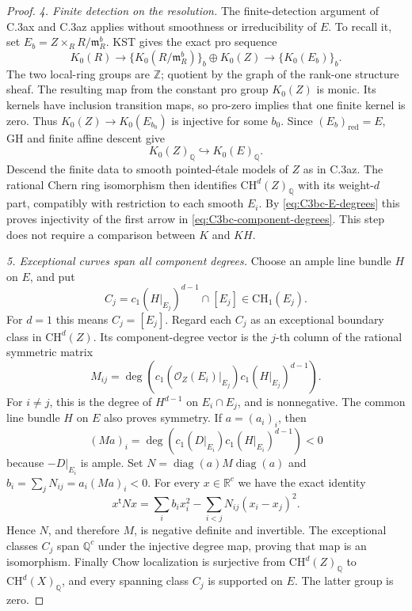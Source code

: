 \begin{proof}
\emph{4. Finite detection on the resolution.}
The finite-detection argument of C.3ax and C.3az applies without
smoothness or irreducibility of \(E\). To recall it, set
\(E_b=Z\times_RR/\mathfrak m_R^b\). KST
\citep[Theorem A and (1.6), author pp.~2--3]
{rootKerzStrunkTamme2018} gives the exact pro sequence
\[
 K_0(R)\longrightarrow
 \{K_0(R/\mathfrak m_R^b)\}_b\oplus K_0(Z)
             \longrightarrow\{K_0(E_b)\}_b.
\]
The two local-ring groups are \(\mathbb Z\); quotient by the
graph of the rank-one structure sheaf. The resulting map from
the constant pro group \(K_0(Z)\) is monic. Its kernels have
inclusion transition maps, so pro-zero implies that one finite
kernel is zero. Thus \(K_0(Z)\to K_0(E_{b_0})\) is injective
for some \(b_0\). Since \((E_b)_{\mathrm{red}}=E\), GH
\citep[Theorem A, p.~29]{rootGeisserHesselholt2011} and finite
affine descent give
\[
                         K_0(Z)_{\mathbb Q}
                              \hookrightarrow K_0(E)_{\mathbb Q}.
\]
Descend the finite data to smooth pointed-\'etale models of \(Z\)
as in C.3az. The rational Chern ring isomorphism
\citep[Example 15.2.16(b), pp.~294--295]{frC4Fulton1998}
then identifies \(\mathrm{CH}^d(Z)_{\mathbb Q}\) with its
weight-\(d\) part, compatibly with restriction to each smooth
\(E_i\). By \eqref{eq:C3bc-E-degrees} this proves injectivity
of the first arrow in \eqref{eq:C3bc-component-degrees}.
This step does not require a comparison between \(K\) and \(KH\).

\emph{5. Exceptional curves span all component degrees.}
Choose an ample line bundle \(H\) on \(E\), and put
\[
 C_j=c_1(H|_{E_j})^{d-1}\cap[E_j]\in\mathrm{CH}_1(E_j).
\]
For \(d=1\) this means \(C_j=[E_j]\).
Regard each \(C_j\) as an exceptional boundary class in
\(\mathrm{CH}^d(Z)\). Its component-degree vector is the \(j\)-th
column of the rational symmetric matrix
\[
 M_{ij}
   =\deg\!\left(c_1(\mathcal O_Z(E_i)|_{E_j})
                       c_1(H|_{E_j})^{d-1}\right).
\]
For \(i\ne j\), this is the degree of \(H^{d-1}\) on
\(E_i\cap E_j\), and is nonnegative. The common line bundle \(H\)
on \(E\) also proves symmetry. If \(a=(a_i)_i\), then
\[
 (Ma)_i
      =\deg\!\left(c_1(D|_{E_i})c_1(H|_{E_i})^{d-1}\right)<0
\]
because \(-D|_{E_i}\) is ample.
Set \(N=\operatorname{diag}(a)M\operatorname{diag}(a)\) and
\(b_i=\sum_jN_{ij}=a_i(Ma)_i<0\).
For every \(x\in\mathbb R^c\) we have the exact identity
\[
 x^{\mathsf t}Nx
    =\sum_i b_ix_i^2
       -\sum_{i<j}N_{ij}(x_i-x_j)^2.
\]
Hence \(N\), and therefore \(M\), is negative definite and
invertible. The exceptional classes \(C_j\) span \(\mathbb Q^c\)
under the injective degree map, proving that map is an
isomorphism. Finally Chow localization is surjective from
\(\mathrm{CH}^d(Z)_{\mathbb Q}\) to
\(\mathrm{CH}^d(X)_{\mathbb Q}\), and every spanning class
\(C_j\) is supported on \(E\). The latter group is zero.
\end{proof}
